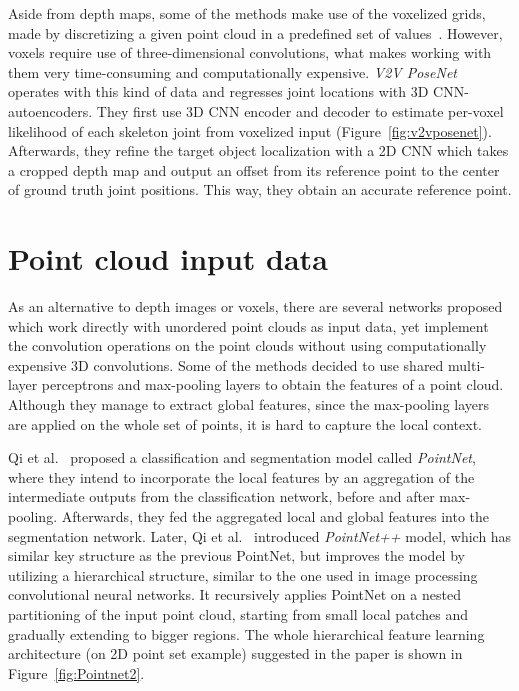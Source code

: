 \noindent Aside from depth maps, some of the methods make use of the voxelized grids, made by discretizing a given point cloud in a predefined set of values~\cite{DBLP:journals/corr/abs-1812-10320,Lekhwani2019FastV2CHandNetFV,DBLP:journals/corr/abs-1711-07399}. However, voxels require use of three-dimensional convolutions, what makes working with them very time-consuming and computationally expensive. \textit{V2V PoseNet}~\cite{DBLP:journals/corr/abs-1711-07399} operates with this kind of data and regresses joint locations with 3D CNN-autoencoders. They first use 3D CNN encoder and decoder to estimate per-voxel likelihood of each skeleton joint from voxelized input (Figure~\ref{fig:v2vposenet}). Afterwards, they refine the target object localization with a 2D CNN which takes a cropped depth map and output an offset from its reference point to the center of ground truth joint positions. This way, they obtain an accurate reference point.\par

\section{Point cloud input data}
As an alternative to depth images or voxels, there are several networks proposed which work directly with unordered point clouds as input data, yet implement the convolution operations on the point clouds without using computationally expensive 3D convolutions. Some of the methods decided to use shared multi-layer perceptrons and max-pooling layers to obtain the features of a point cloud. Although they manage to extract global features, since the max-pooling layers are applied on the whole set of points, it is hard to capture the local context.\par
\vspace{5mm}

\noindent Qi et al.~\cite{DBLP:journals/corr/QiSMG16} proposed a classification and segmentation model called \textit{PointNet}, where they intend to incorporate the local features by an aggregation of the intermediate outputs from the classification network, before and after max-pooling. Afterwards, they fed the aggregated local and global features into the segmentation network. Later, Qi et al.~\cite{DBLP:journals/corr/QiYSG17} introduced \textit{PointNet++} model, which has similar key structure as the previous PointNet, but improves the model by utilizing a hierarchical structure, similar to the one used in image processing convolutional neural networks. It recursively applies PointNet on a nested partitioning of the input point cloud, starting from small local patches and gradually extending to bigger regions. The whole hierarchical feature learning architecture (on 2D point set example) suggested in the paper is shown in Figure~\ref{fig:Pointnet2}. \par

